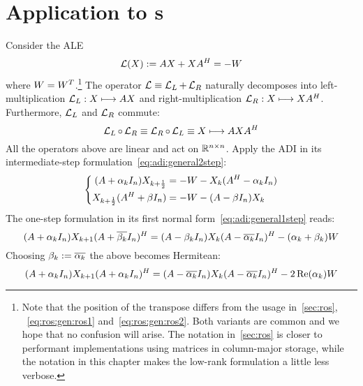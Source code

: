 \section{Application to \texorpdfstring{s}{ALEs}}
\label{sec:adi:ale}

Consider the \ac{ALE}
\begin{equation}
\label{eq:adi:ale}
  \operatorname{\mathcal L}(X) := AX + XA^H = -W
\end{equation}
where $W = W^T$.\footnote{%
  Note that the position of the transpose differs from the usage in~\autoref{sec:ros},
  \eg~\eqref{eq:ros:gen:ros1} and~\eqref{eq:ros:gen:ros2}.
  Both variants are common and we hope that no confusion will arise.
  The notation in~\autoref{sec:ros} is closer to performant implementations using matrices in column-major storage,
  while the notation in this chapter makes the low-rank formulation a little less verbose.
}
The \Lyapunov operator $\operatorname{\mathcal L} \equiv \operatorname{\mathcal L}_L + \operatorname{\mathcal L}_R$ naturally decomposes into
left-multiplication $\operatorname{\mathcal L}_L : X \longmapsto AX$ and
right-multiplication $\operatorname{\mathcal L}_R : X \longmapsto XA^H$.
Furthermore, $\operatorname{\mathcal L}_L$ and $\operatorname{\mathcal L}_R$ commute:
\begin{equation}
  \operatorname{\mathcal L}_L \circ \operatorname{\mathcal L}_R \equiv \operatorname{\mathcal L}_R \circ \operatorname{\mathcal L}_L \equiv X \longmapsto AXA^H
\end{equation}
All the operators above are linear and act on $\mathbb{R}^{n\times n}$.
Apply the \ac{ADI} in its intermediate-step formulation~\eqref{eq:adi:general2step}:
\begin{equation}
  \left\{
  \begin{aligned}
    (A + \alpha_k I_n) X_{k+\frac{1}{2}} &= -W - X_k (A^H - \alpha_k I_n) \\
    X_{k+\frac{1}{2}} (A^H + \beta I_n) &= -W - (A - \beta I_n) X_k
  \end{aligned}
  \right.
\end{equation}
The one-step formulation in its first normal form~\eqref{eq:adi:general1step} reads:
\begin{equation}
  (A + \alpha_k I_n)
  X_{k+1}
  (A + \conj{\beta_k} I_n)^\HT
  =
  (A - \beta_k I_n)
  X_k
  (A - \conj{\alpha_k} I_n)^\HT
  - (\alpha_k + \beta_k)
  W
\end{equation}
Choosing $\beta_k := \conj{\alpha_k}$
the above becomes Hermitean:
\begin{equation}
\label{eq:adi:ale1step}
  (A + \alpha_k I_n)
  X_{k+1}
  (A + \alpha_k I_n)^\HT
  =
  (A - \conj{\alpha_k} I_n)
  X_k
  (A - \conj{\alpha_k} I_n)^\HT
  - 2\Re(\alpha_k)
  W
\end{equation}

